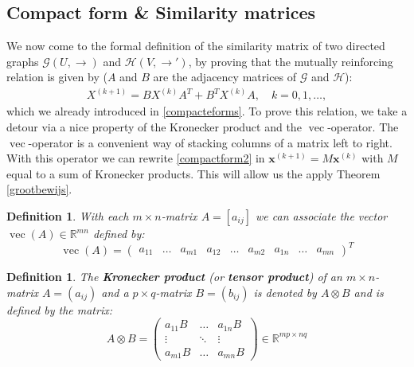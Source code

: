 \documentclass[a4paper,11pt]{report}
\newtheorem{definition}[theorem]{Definition}
\newcommand{\R}{{\mathbb R}}
\newcommand{\graf}{\mathscr{G}}
\newcommand{\grafeen}{\mathscr{H}}
\newcommand{\vect}{\operatorname{vec}}
\begin{document}
\subsection{Compact form \& Similarity matrices}
We now come to the formal definition of the similarity matrix of two directed 
graphs $\graf(U,\to)$ and $\grafeen(V, \to')$, by proving that the mutually reinforcing relation
is given by ($A$ and $B$ are the adjacency matrices of $\graf$ and $\grafeen$):
 \begin{eqnarray}\label{compactform2}
X^{(k+1)} = BX^{(k)}A^T + B^TX^{(k)}A,\quad k=0,1,\ldots,
  \end{eqnarray}
which we already introduced in \ref{compacteforms}. To prove this relation, we take a 
detour via a nice property of the Kronecker product and the $\vect$-operator. The $\vect$-operator
is a convenient way of stacking columns of a matrix left to right. With this operator 
we can rewrite \ref{compactform2} in $\mathbf{x}^{(k+1)} = M\mathbf{x}^{(k)}$ with $M$ equal to a sum of Kronecker products. This will 
allow us the apply Theorem \ref{grootbewijs}.
\begin{definition}
  With each $m\times n$-matrix $A = [a_{ij}]$ we can associate the vector $\vect(A) \in \R^{mn}$ 
  defined by:
  $$\vect(A) = \begin{pmatrix}
  a_{11} & \ldots & a_{m1} & a_{12} & \ldots & a_{m2} & a_{1n} & \ldots & a_{mn}
  \end{pmatrix}^T$$
\end{definition}

\begin{definition}
  The  \textbf{Kronecker product} (or \textbf{tensor product}) of an $m \times 
  n$-matrix $A = (a_{ij})$ and a $p \times q$-matrix $B = (b_{ij})$ is denoted 
  by $A \otimes B$ and is defined by the matrix:
  $$A \otimes B = \begin{pmatrix}
  a_{11}B & \ldots & a_{1n}B\\
  \vdots & \ddots & \vdots \\
  a_{m1}B & \ldots & a_{mn}B
  \end{pmatrix} \in \R^{mp \times nq}$$
\end{definition}
\end{document}
